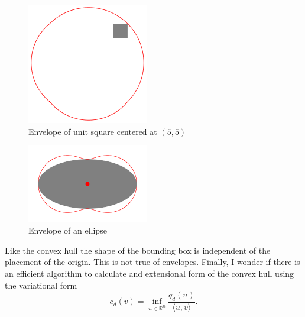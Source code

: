 \documentclass[11pt]{amsart}
\begin{document}
  \begin{figure}[h]
    \centering
    \includegraphics[width=150pt]{sq1_11.png}
    \caption{Envelope of unit square centered at $(5,5)$}
  \end{figure}

  \begin{figure}[h]
    \centering
    \includegraphics[width=150pt]{c1_00.png}
    \caption{Envelope of an ellipse}
  \end{figure}

  Like the convex hull the shape of the bounding box is independent of the placement of the origin. This is not true of envelopes.
  Finally, I wonder if there is an efficient algorithm to calculate and extensional form of the convex hull using the variational form
  $$c_d(v) = \inf_{u \in \mathbb{R}^n}  \frac{q_d(u)}{\langle u, v \rangle}.$$

  
\end{document}
